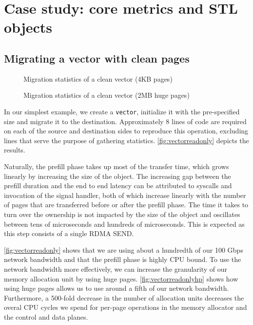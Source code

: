 \section{Case study: core metrics and STL objects}
\subsection{Migrating a vector with clean pages}
\label{sec:cleanvec}

\begin{figure}[tp]
    \begin{center}
        
    \end{center}
    \caption{Migration statistics of a clean vector (4KB pages)}
    \label{fig:vectorreadonly}
\end{figure}

\begin{figure}[tp]
    \begin{center}
        
    \end{center}
    \caption{Migration statistics of a clean vector (2MB huge pages)}
    \label{fig:vectorreadonlyhp}
\end{figure}

In our simplest example, we create a \texttt{vector}, initialize it with the
pre-specified size and migrate it to the destination. Approximately $8$ lines
of code are required on each of the source and destination sides to reproduce
this operation, excluding lines that serve the purpose of gathering statistics.
\autoref{fig:vectorreadonly} depicts the results.

Naturally, the prefill phase takes up most of the transfer time, which grows
linearly by increasing the size of the object. The increasing gap between the
prefill duration and the end to end latency can be attributed to syscalls and
invocation of the signal handler, both of which increase linearly with the
number of pages that are transferred before or after the prefill phase. The
time it takes to turn over the ownership is not impacted by the
size of the object and oscillates between tens of microseconds and hundreds
of microseconds. This is expected as this step consists of a single RDMA SEND.

\autoref{fig:vectorreadonly} shows that we are using about a hundredth of our 100 Gbps
network bandwidth and that the prefill phase is highly CPU bound. To use the
network bandwidth more effectively, we can increase the granularity of our
memory allocation unit by using huge pages. \autoref{fig:vectorreadonlyhp} shows
how using huge pages allows us to use around a fifth of our network bandwidth.
Furthermore, a 500-fold decrease in the number of allocation units decreases
the overal CPU cycles we spend for per-page operations in the memory allocator
and the control and data planes.

